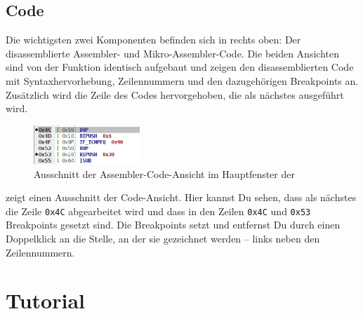 \subsection{Code}
Die wichtigsten zwei Komponenten befinden sich in  rechts oben: Der disassemblierte Assembler- und Mikro-Assembler-Code. Die beiden Ansichten sind von der Funktion identisch aufgebaut und zeigen den disassemblierten Code mit Syntaxhervorhebung, Zeilennummern und den dazugehörigen Breakpoints an. Zusätzlich wird die Zeile des Codes hervorgehoben, die als nächstes ausgeführt wird.

\begin{figure}[h]
	\centering
	\includegraphics[width=4cm]{images/main-frame-code-part}
	\caption{Ausschnitt der Assembler-Code-Ansicht im Hauptfenster der \mdg}
\end{figure}

 zeigt einen Ausschnitt der Code-Ansicht. Hier kannst Du sehen, dass als nächstes die Zeile \texttt{0x4C} abgearbeitet wird und dass in den Zeilen \texttt{0x4C} und \texttt{0x53} Breakpoints gesetzt sind. Die Breakpoints setzt und entfernst Du durch einen Doppelklick an die Stelle, an der sie gezeichnet werden -- links neben den Zeilennummern.


\section{Tutorial}